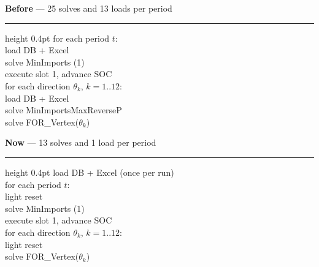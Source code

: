 \documentclass[11pt,a4paper]{article}
\begin{document}
\begin{minipage}[t]{0.475\textwidth}
{\small\textbf{Before} --- 25 solves and 13 loads per period}
\vspace{2pt}\hrule height 0.4pt
\vspace{4pt}
{\footnotesize\ttfamily
for each period $t$:\\
\hspace*{2mm}load DB + Excel\\
\hspace*{2mm}solve MinImports \hfill(1)\\
\hspace*{2mm}execute slot 1, advance SOC\\
\hspace*{2mm}for each direction $\theta_k$, $k=1..12$:\\
\hspace*{6mm}\textcolor{uaired}{load DB + Excel}\\
\hspace*{6mm}\textcolor{uaired}{solve MinImportsMaxReverseP}\\
\hspace*{6mm}solve FOR\_Vertex($\theta_k$)\\
}
\end{minipage}\hfill
\begin{minipage}[t]{0.475\textwidth}
{\small\textbf{Now} --- 13 solves and 1 load per period}
\vspace{2pt}\hrule height 0.4pt
\vspace{4pt}
{\footnotesize\ttfamily
load DB + Excel \textcolor{uaired}{(once per run)}\\
for each period $t$:\\
\hspace*{2mm}\textcolor{uaired}{light reset}\\
\hspace*{2mm}solve MinImports \hfill(1)\\
\hspace*{2mm}execute slot 1, advance SOC\\
\hspace*{2mm}for each direction $\theta_k$, $k=1..12$:\\
\hspace*{6mm}\textcolor{uaired}{light reset}\\
\hspace*{6mm}solve FOR\_Vertex($\theta_k$)\\
}
\end{minipage}
\end{document}
